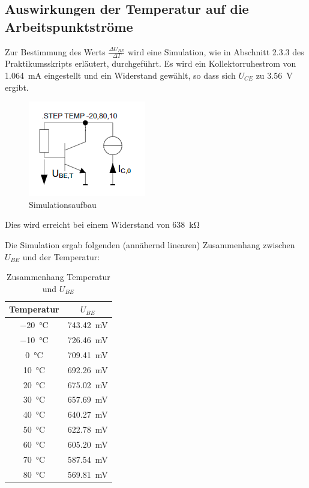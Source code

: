 \subsection{Auswirkungen der Temperatur auf die Arbeitspunktströme}

Zur Bestimmung des Werts $\frac{\Delta U_{BE}}{\Delta T}$ wird eine Simulation, wie in Abschnitt 2.3.3 des Praktikumsskripts erläutert, durchgeführt.
Es wird ein Kollektorruhestrom von \SI{1.064}{\milli \ampere} eingestellt und ein Widerstand gewählt, so dass sich $U_{CE}$ zu \SI{3.56}{\volt} ergibt.

\begin{figure}[H]
    \centering
    \includegraphics{tex/1_Microphone/pictures/Aufbau, Tempsimulation.png}
    \caption{Simulationsaufbau}
    \label{fig:my_label}
\end{figure}

Dies wird erreicht bei einem Widerstand von \SI{638}{\kilo \ohm}

Die Simulation ergab folgenden (annähernd linearen) Zusammenhang zwischen $U_{BE}$ und der Temperatur:

\begin{table}[H]
    \centering
    \begin{tabular}{|c|c|}
    \hline
         Temperatur & $U_{BE}$  \\ \hline \hline
         \SI{-20}{\celsius}& \SI{743.42}{\milli \volt} \\ \hline
         \SI{-10}{\celsius}& \SI{726.46}{\milli \volt} \\ \hline
         \SI{0}{\celsius}& \SI{709.41}{\milli \volt} \\ \hline
         \SI{10}{\celsius}& \SI{692.26}{\milli \volt} \\ \hline
         \SI{20}{\celsius}& \SI{675.02}{\milli \volt} \\ \hline
         \SI{30}{\celsius}& \SI{657.69}{\milli \volt} \\ \hline
         \SI{40}{\celsius}& \SI{640.27}{\milli \volt} \\ \hline
         \SI{50}{\celsius}& \SI{622.78}{\milli \volt} \\ \hline
         \SI{60}{\celsius}& \SI{605.20}{\milli \volt} \\ \hline
         \SI{70}{\celsius}& \SI{587.54}{\milli \volt} \\ \hline
         \SI{80}{\celsius}& \SI{569.81}{\milli \volt} \\ \hline
    \end{tabular}
    \caption{Zusammenhang Temperatur und $U_{BE}$}
    \label{tab:my_label}
\end{table}

